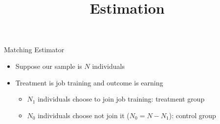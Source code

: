 \documentclass[dvipsnames,hyperref={pdfpagelabels=false}]{beamer}
\begin{document}
\title[]  
{Estimation}


\author 
{}

\institute{}

\date
{}


\begin{frame}{}
\titlepage
\end{frame}


\begin{frame}{Matching Estimator}
\begin{itemize}
	
\item Suppose our sample is $N$ individuals
\vspace{0.3cm}
\item Treatment is job training and outcome is earning
\vspace{0.3cm}
\begin{itemize}
	\item $N_1$ individuals choose to join job training: treatment group
	\vspace{0.3cm}
	\item $N_0$ individuals choose not join it ($N_0=N-N_1$): control group
\end{itemize}

\end{itemize}
\end{frame}
\end{document}
